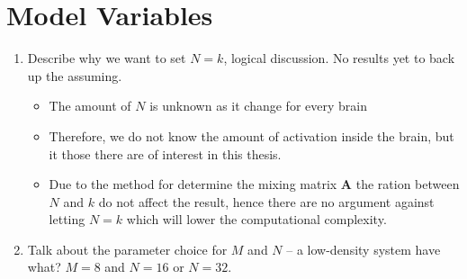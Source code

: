 \section{Model Variables}

\begin{enumerate}
\item Describe why we want to set $N = k$, logical discussion. No results yet to back up the assuming.
	\begin{itemize}
	\item The amount of $N$ is unknown as it change for every brain
	\item Therefore, we do not know the amount of activation inside the brain, but it those there are of interest in this thesis.
	\item Due to the method for determine the mixing matrix $\textbf{A}$ the ration between $N$ and $k$ do not affect the result, hence there are no argument against letting $N=k$ which will lower the computational complexity.    
	\end{itemize}
\item Talk about the parameter choice for $M$ and $N$ -- a low-density system have what? $M =  8$ and $N = 16$ or $N = 32$.
\end{enumerate}
